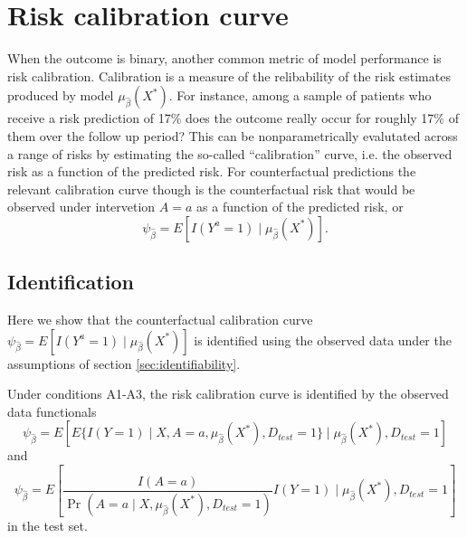 \section{Risk calibration curve}
When the outcome is binary, another common metric of model performance is risk calibration. Calibration is a measure of the relibability of the risk estimates produced by model $\mu_{\widehat{\beta}}(X^*)$. For instance, among a sample of patients who receive a risk prediction of 17\% does the outcome really occur for roughly 17\% of them over the follow up period? This can be nonparametrically evalutated across a range of risks by estimating the so-called ``calibration'' curve, i.e. the observed risk as a function of the predicted risk. For counterfactual predictions the relevant calibration curve though is the counterfactual risk that would be observed under intervetion $A=a$ as a function of the predicted risk, or
\begin{equation}\label{eqn:calib_estimand}
    \psi_{\widehat{\beta}} = E[I(Y^a = 1) \mid \mu_{\widehat{\beta}}(X^*)].
\end{equation}

\subsection{Identification}
Here we show that the counterfactual calibration curve $\psi_{\widehat{\beta}} = E[I(Y^a = 1) \mid \mu_{\widehat{\beta}}(X^*)]$ is identified using the observed data under the assumptions of section \ref{sec:identifiability}.
\begin{theorem}
     Under conditions A1-A3, the risk calibration curve is identified by the observed data functionals
\begin{equation}\label{eqn:cl_calib_estimand}
    \psi_{\widehat{\beta}} = E[E\{I(Y = 1) \mid X, A = a, \mu_{\widehat{\beta}}(X^*), D_{test} = 1\}\mid \mu_{\widehat{\beta}}(X^*), D_{test} = 1]
\end{equation}
and 
\begin{equation}\label{eqn:ipw_calib_estimand}
    \psi_{\widehat{\beta}} = E\left[\frac{I(A = a)}{\Pr(A = a \mid X, \mu_{\widehat{\beta}}(X^*), D_{test} = 1)} I(Y=1) \mid \mu_{\widehat{\beta}}(X^*), D_{test} = 1\right]
\end{equation}
in the test set. 

\end{theorem}

